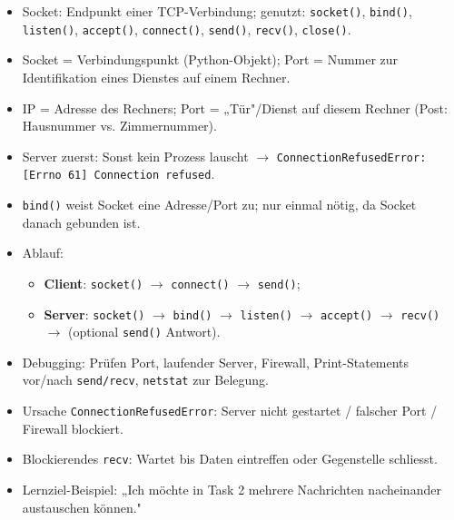 \begin{myexercise}
            \begin{myanswer}
            \begin{itemize}
                \item Socket: Endpunkt einer TCP-Verbindung; genutzt: \texttt{socket()}, \texttt{bind()}, \texttt{listen()}, \texttt{accept()}, \texttt{connect()}, \texttt{send()}, \texttt{recv()}, \texttt{close()}.
                \item Socket = Verbindungspunkt (Python-Objekt); Port = Nummer zur Identifikation eines Dienstes auf einem Rechner.
                \item \gls{IP} = Adresse des Rechners; Port = „Tür"/Dienst auf diesem Rechner (Post: Hausnummer vs. Zimmernummer).
                \item Server zuerst: Sonst kein Prozess lauscht $\rightarrow$ \texttt{ConnectionRefusedError: [Errno 61] Connection refused}.
                \item \texttt{bind()} weist Socket eine Adresse/Port zu; nur einmal nötig, da Socket danach gebunden ist.
                \item Ablauf:
                  \begin{itemize}
                      \item \textbf{Client}: \texttt{socket()} $\rightarrow$ \texttt{connect()} $\rightarrow$ \texttt{send()};
                      \item \textbf{Server}: \texttt{socket()} $\rightarrow$ \texttt{bind()} $\rightarrow$ \texttt{listen()} $\rightarrow$ \texttt{accept()} $\rightarrow$ \texttt{recv()} $\rightarrow$ (optional \texttt{send()} Antwort).
                  \end{itemize}

                \item Debugging: Prüfen Port, laufender Server, Firewall, Print-Statements vor/nach \texttt{send/recv}, \texttt{netstat} zur Belegung.
                \item Ursache \texttt{ConnectionRefusedError}: Server nicht gestartet / falscher Port / Firewall blockiert.
                \item Blockierendes \texttt{recv}: Wartet bis Daten eintreffen oder Gegenstelle schliesst.
                \item Lernziel-Beispiel: „Ich möchte in Task 2 mehrere Nachrichten nacheinander austauschen können."
            \end{itemize}
            \end{myanswer}
        \end{myexercise}

